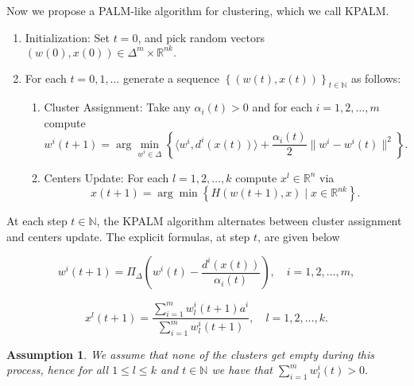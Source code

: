 \documentclass[11pt]{article}
\numberwithin{equation}{section}
\newtheorem{assumption}{Assumption}
\begin{document}
Now we propose a PALM-like algorithm for clustering, which we call KPALM.
\begin{enumerate}[(1)]
	\item Initialization: Set $t=0$, and pick random vectors $(w(0),x(0)) \in \Delta^m \times \mathbb{R}^{nk} .$

	\item For each $t=0,1, \ldots$ generate a sequence $\left\lbrace(w(t),x(t))\right\rbrace_{t \in \mathbb{N}}$ as follows:
	\begin{enumerate}[(2.1)]
		\item Cluster Assignment: Take any $\alpha_i(t) > 0$ and for each $i=1, 2, \ldots ,m$ compute
		\begin{equation}
			w^i(t+1) = \arg\min\limits_{w^i \in \Delta} \left\lbrace \langle w^i , d^i(x(t)) \rangle + \frac{\alpha_i(t)}{2} \|w^i - w^i(t)\|^2 \right\rbrace . \label{StateEq5}
		\end{equation}
		
		\item Centers Update: For each $l=1, 2, \ldots ,k$ compute $x^l \in \mathbb{R}^n$ via
		\begin{equation}
			x(t+1) = \arg\min \left\lbrace H(w(t+1), x) \mid x \in \mathbb{R}^{nk} \right\rbrace . \label{StateEq6}
		\end{equation}
	\end{enumerate}
\end{enumerate}

\newpage

At each step $t \in \mathbb{N}$, the KPALM algorithm alternates between cluster assignment and centers update. The explicit formulas, at step $t$, are given below

\begin{equation}
w^i(t+1) = \Pi_{\Delta} \left(w^i(t) - \frac{d^i(x(t))}{\alpha_i(t)}\right) , \quad i=1, 2, \ldots ,m , \label{StateEq7}
\end{equation}

\begin{equation}
x^l(t+1) = \frac{\sum_{i=1}^{m} w^i_l(t+1) a^i}{\sum_{i=1}^{m} w^i_l(t+1)} , \quad l=1, 2, \ldots ,k . \label{StateEq8}
\end{equation}

\begin{assumption} \label{StateEq17}
We assume that none of the clusters get empty during this process, hence for all $1 \leq l \leq k$ and $t \in \mathbb{N}$ we have that $\sum\limits_{i=1}^{m} w^i_l(t) > 0$.
\end{assumption}
	
\end{document}
